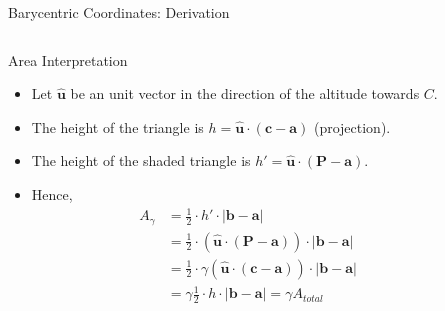 \begin{frame}{Barycentric Coordinates: Derivation}
    \begin{columns}
        \begin{column}{0.65\textwidth}
            \begin{mathbox}{Area Interpretation}
                \begin{itemize}
                    \small
                    \item  Let $\hat{\mathbf{u}}$ be an unit vector in the direction of the altitude towards $C$. 
                    \pause
                    \item  The height of the triangle is $h = \hat{\mathbf{u}} \cdot (\mathbf{c} - \mathbf{a})$ (projection).
                    \pause
                    \item  The height of the shaded triangle is $h' = \hat{\mathbf{u}} \cdot (\mathbf{P} - \mathbf{a})$.
                    \pause
                    \item  Hence, \begin{align*}
                        A_{\gamma} &= \frac{1}{2} \cdot h' \cdot |\mathbf{b} - \mathbf{a}| \\
                        &= \frac{1}{2} \cdot \left (\hat{\mathbf{u}} \cdot (\mathbf{P} - \mathbf{a}) \right ) \cdot |\mathbf{b} - \mathbf{a}|  \\
                        &= \frac{1}{2} \cdot \gamma \left (\hat{\mathbf{u}} \cdot (\mathbf{c} - \mathbf{a}) \right ) \cdot |\mathbf{b} - \mathbf{a}|  \\
                        &= \gamma \frac{1}{2} \cdot h \cdot |\mathbf{b} - \mathbf{a}| = \gamma A_{total}
                    \end{align*}
                \end{itemize}
            \end{mathbox}    
        \end{column}
        \begin{column}{0.35\textwidth}
\end{column}
\end{columns}
\end{frame}
